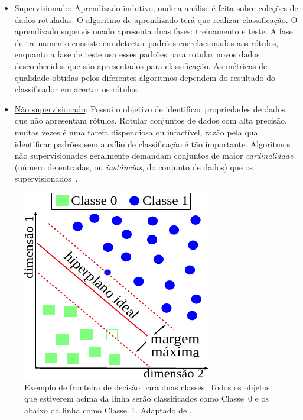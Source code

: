 \begin{itemize}
    \item \underline{Supervisionado}: 
    Aprendizado indutivo, onde a análise é feita sobre coleções de dados rotuladas.
    O algoritmo de aprendizado terá que realizar classificação.
    O aprendizado supervisionado apresenta duas fases: treinamento e teste.
    A fase de treinamento consiste em detectar padrões correlacionados aos rótulos, enquanto a fase de teste usa esses padrões para rotular novos dados desconhecidos que são apresentados para classificação.
    As métricas de qualidade obtidas pelos diferentes algoritmos dependem do resultado do classificador em acertar os rótulos.  

    \item \underline{Não supervisionado}: 
    Possui o objetivo de identificar propriedades de dados que não apresentam rótulos.
    Rotular conjuntos de dados com alta precisão, muitas vezes é uma tarefa dispendiosa ou infactível, razão pela qual identificar padrões sem auxílio de classificação é tão importante.
    Algoritmos não supervisionados geralmente demandam conjuntos de maior \textit{cardinalidade} (número de entradas, ou \textit{instâncias}, do conjunto de dados) que os supervisionados~\cite{hastie2009}.
\end{itemize}

    \begin{figure}[!t]
    \centering
    \includegraphics[scale=1]{_fig/class.pdf}
    \caption[Exemplo de fronteira de decisão para duas classes]{Exemplo de fronteira de decisão para duas classes. 
    Todos os objetos que estiverem acima da linha serão classificados como Classe~0 e os abaixo da linha como Classe~1. 
    Adaptado de .}
    \label{fig:class}
    \end{figure}

